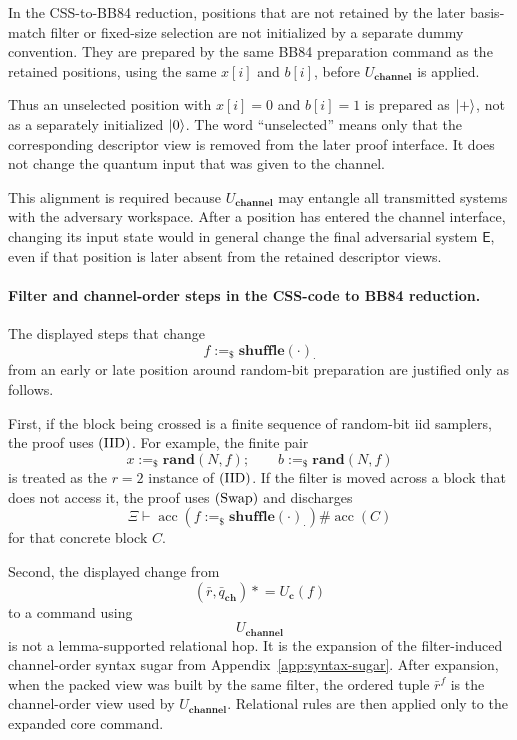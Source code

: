 \documentclass[acmsmall,screen,review,anonymous,nonacm]{acmart}
\theoremstyle{defn_style}
\newcommand{\asteq}{\mathrel{*}=}
\begin{document}
In the CSS-to-BB84 reduction, positions that are not retained by the later
basis-match filter or fixed-size selection are not initialized by a separate
dummy convention.  They are prepared by the same BB84 preparation command as
the retained positions, using the same \(x[i]\) and \(b[i]\), before
\(U_{\textbf{channel}}\) is applied.

Thus an unselected position with \(x[i]=0\) and \(b[i]=1\) is prepared as
\(\ket{+}\), not as a separately initialized \(\ket0\).  The word
``unselected'' means only that the corresponding descriptor view is removed
from the later proof interface.  It does not change the quantum input that was
given to the channel.

This alignment is required because \(U_{\textbf{channel}}\) may entangle all
transmitted systems with the adversary workspace.  After a position has entered
the channel interface, changing its input state would in general change the
final adversarial system \(\mathsf E\), even if that position is later absent
from the retained descriptor views.

\paragraph{Filter and channel-order steps in the CSS-code to BB84 reduction.}

The displayed steps that change
\[
f:=_{\$}\mathbf{shuffle}(\cdot)_{\cdot}
\]
from an early or late position around random-bit preparation are justified only
as follows.

First, if the block being crossed is a finite sequence of random-bit iid
samplers, the proof uses \({\rm (IID)}\).  For example, the finite pair
\[
x:=_{\$}\mathbf{rand}(N,f);
\qquad
b:=_{\$}\mathbf{rand}(N,f)
\]
is treated as the \(r=2\) instance of \({\rm (IID)}\).  If the filter is moved
across a block that does not access it, the proof uses \({\rm (Swap)}\) and
discharges
\[
\Xi\vdash
\operatorname{acc}\!\left(f:=_{\$}\mathbf{shuffle}(\cdot)_{\cdot}\right)
\#
\operatorname{acc}(C)
\]
for that concrete block \(C\).

Second, the displayed change from
\[
(\bar r,\bar q_{\mathbf{ch}})\asteq U_{\textbf{c}}(f)
\]
to a command using
\[
U_{\textbf{channel}}
\]
is not a lemma-supported relational hop.  It is the expansion of the
filter-induced channel-order syntax sugar from Appendix~\ref{app:syntax-sugar}.
After expansion, when the packed view was built by the same filter, the ordered
tuple \(\bar r^{f}\) is the channel-order view used by
\(U_{\textbf{channel}}\).  Relational rules are then applied only to the
expanded core command.
\end{document}
